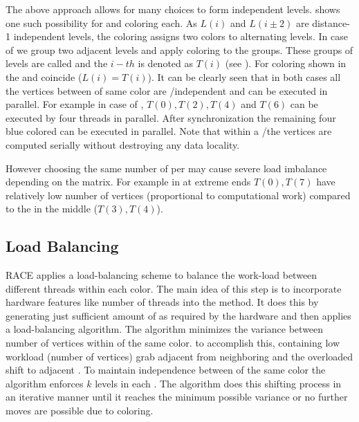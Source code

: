   \setlength{\belowcaptionskip}{0pt}
The above approach allows for many choices to form \DK independent levels.  shows 
one such possibility for \DONE and \DTWO coloring each. As $L(i)$ and $L(i\pm2)$ are
distance-1 independent levels, the \DONE coloring  assigns
two colors to alternating levels.  In case of \DTWO we group two adjacent levels and apply \DONE
coloring to the groups. These groups of levels are called \levelGroups
 and the $i-th$ \levelGroup is denoted as $T(i)$ (see ).
For \DONE coloring shown in  the \levels and \levelGroups
coincide ($L(i) = T(i)$).
It can be clearly seen that in both cases
 all the vertices  between \levelGroups of same color
  are \DONE/\DTWO independent  and can be executed in parallel.
   For example in case of \DTWO, \levelGroups $T(0), T(2), T(4)$
 and $T(6)$ can be executed by four threads in parallel. After synchronization the remaining 
 four blue colored \levelGroups can be executed in parallel. Note that
 within a \levelGroup/\level the vertices are computed serially without destroying
 any data locality.

However choosing the same number of \levels per \levelGroup may cause severe
load imbalance depending on the matrix. For example in  
 \levelGroups at extreme ends $T(0), T(7)$  have relatively low number of 
 vertices (proportional to computational work)  compared to the \levelGroups 
 in the middle ($T(3),T(4)$).


\subsection{Load Balancing}
\Acrshort{RACE} applies a load-balancing scheme to balance the work-load
between different threads within each color. The main idea of this step
is to incorporate hardware features like number of threads into the 
method. It does this by generating just sufficient amount of \levelGroups 
as required by the hardware and then applies a load-balancing algorithm.
The algorithm minimizes the variance between number of vertices 
within \levelGroups of the same color. \Inorder to
 accomplish this, \levelGroups containing low workload (number of vertices)
 grab adjacent \levels from neighboring \levelGroups and the overloaded
 \levelGroups shift \levels to adjacent \levelGroups. To maintain
 \DK independence between \levelGroups of the same color the algorithm enforces \atleast $k$ levels in each \levelGroup. The algorithm 
 does this shifting process in an iterative manner until it reaches the
 minimum possible variance or no further moves are possible due to
 \DK coloring.
 
